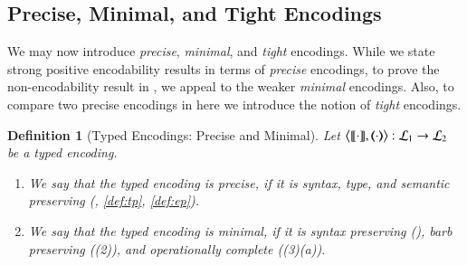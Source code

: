 \documentclass[preprint,11pt]{elsarticle}
\newtheorem{definition}{Definition}[section]
\newtheorem{proposition}{Proposition}[section]
\begin{document}
{{%
%
%


\subsection{Precise, Minimal, and Tight Encodings}
We may now introduce 
\emph{precise}, \emph{minimal}, and \emph{tight}
 encodings.
While we state strong positive encodability results %
in terms of {\em precise} encodings,
to prove the non-encodability result in , 
we appeal to the weaker {\em minimal} encodings.  
Also, to compare two precise encodings in  here we introduce the notion of \emph{tight} encodings.

\begin{definition}[Typed Encodings: Precise and Minimal]%
\label{def:goodenc}
Let $\big\langle \llbracket\cdot\rrbracket, (\!\!\langle\cdot\rangle\!\!)\big\rangle: \mathcal{L}_1 \to \mathcal{L}_2$ be a typed encoding.
\begin{enumerate}[-]
\item We say that 
	the typed encoding 
	 is 
	\emph{precise}, if it is syntax, type, and semantic preserving (, \ref{def:tp}, \ref{def:ep}).
	\item 
	We say that the typed encoding is
	\emph{minimal}, if it is syntax preserving 
	(),
	barb preserving ((2)), 
	and operationally complete ((3)(a)).
	\end{enumerate}
\end{definition}



}}
\end{document}

